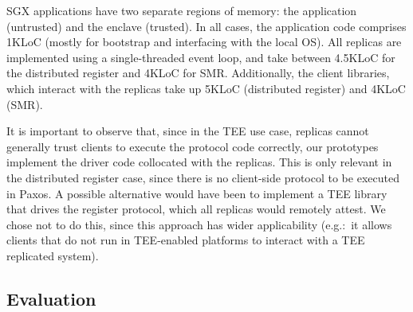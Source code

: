 SGX applications have two separate regions of memory: the
application (untrusted) and the enclave (trusted). In all cases,
the application code comprises 1KLoC (mostly for bootstrap and
interfacing with the local \ac{OS}). All replicas are implemented
using a single-threaded event loop, and take between 4.5KLoC for
the distributed register and 4KLoC for \ac{SMR}. Additionally, the client libraries, which
interact with the replicas take up 5KLoC (distributed
register) and 4KLoC (\ac{SMR}).

It is important to observe that, since in the \ac{TEE} use case,
replicas cannot generally trust clients to execute the protocol
code correctly, our prototypes implement the driver code
collocated with the replicas. This is only relevant in the
distributed register case, since there is no client-side protocol
to be executed in Paxos. A possible alternative would have been
to implement a \ac{TEE} library that drives the register
protocol, which all replicas would remotely attest. We chose
not to do this, since this approach has wider applicability
(e.g.:\ it allows clients that do not run in \ac{TEE}-enabled
platforms to interact with a \ac{TEE} replicated system).

\subsection{Evaluation}\label{sec:eval}

